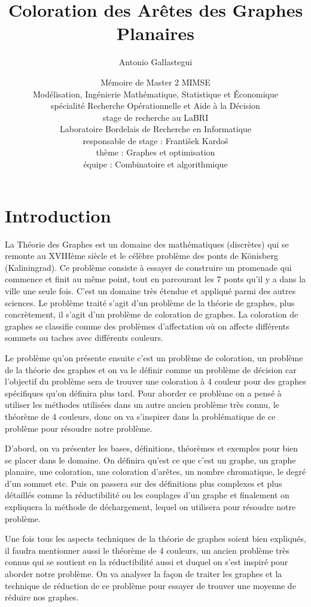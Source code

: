 \documentclass[10pt,a4paper]{article}
\title{Coloration des Arêtes des Graphes Planaires}
\author{Antonio Gallastegui
 }
\date{
 Mémoire de Master 2 MIMSE \\
  Modélisation, Ingénierie Mathématique, Statistique et Économique \\
  spécialité Recherche Opérationnelle et Aide à la Décision \\\bigskip
  stage de recherche au LaBRI\\
  Laboratoire Bordelais de Recherche en Informatique \\
  responsable de stage : Franti\v sek Kardo\v s  \\
  thème : Graphes et optimisation \\
  équipe : Combinatoire et algorithmique  \\
 }
\begin{document}
\thispagestyle{empty}
\maketitle

\section{Introduction}
La Théorie des Graphes est un domaine des mathématiques (discrètes) qui se remonte au XVIIIème siècle et le célèbre problème des ponts de Könisberg (Kaliningrad). Ce problème consiste à essayer de construire un promenade qui commence et finit au même point, tout en parcourant les 7 ponts qu'il y a dans la ville une seule fois. C'est un domaine très étendue et appliqué parmi des autres sciences. Le problème traité s'agit d'un problème de la théorie de graphes, plus concrètement, il s'agit d'un problème de coloration de graphes.  La coloration de graphes se classifie comme des problèmes d'affectation où on affecte différents sommets ou taches avec différents couleurs. 

Le problème qu'on présente ensuite c'est un problème de coloration, un problème de la théorie des graphes et on va le définir comme un problème de décision car l'objectif du problème sera de trouver une coloration à 4 couleur pour des graphes spécifiques qu'on définira plus tard. Pour aborder ce problème on a pensé à utiliser les méthodes utilisées dans un autre ancien problème très connu, le théorème de 4 couleurs, donc on va s'inspirer dans la problématique de ce problème pour résoudre notre problème.

D'abord, on va présenter les bases, définitions, théorèmes et exemples pour bien se placer dans le domaine. On définira qu'est ce que c'est un graphe, un graphe planaire, une coloration, une coloration d'arêtes, un nombre chromatique, le degré d'un sommet etc. Puis on passera sur des définitions plus complexes et plus détaillés comme la réductibilité ou les couplages d'un graphe et finalement on expliquera la méthode de déchargement, lequel on utilisera pour résoudre notre problème. 

Une fois tous les aspects techniques de la théorie de graphes soient bien expliqués, il faudra mentionner aussi le théorème de 4 couleurs, un ancien problème très connus qui se soutient en la réductibilité aussi et duquel on s'est inspiré pour aborder notre problème. On va analyser la façon de traiter les graphes et la technique de réduction de ce problème pour essayer de trouver une moyenne de réduire nos graphes.
\end{document}
